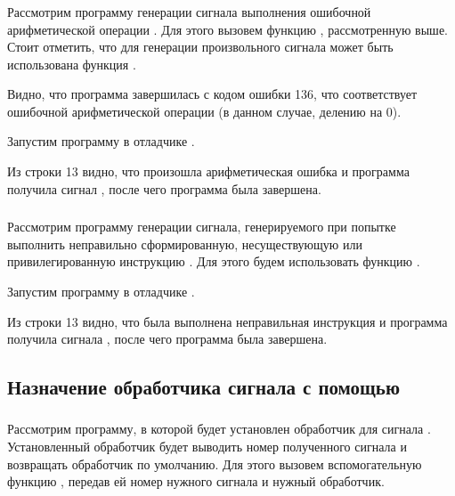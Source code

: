 \subsubsection{}

Рассмотрим программу генерации сигнала выполнения ошибочной арифметической операции . Для этого вызовем функцию , рассмотренную выше. Стоит отметить, что для генерации произвольного сигнала может быть использована функция .


Видно, что программа завершилась с кодом ошибки 136, что соответствует ошибочной арифметической операции (в данном случае, делению на 0).

Запустим программу  в отладчике .


Из строки 13 видно, что произошла арифметическая ошибка и программа получила сигнал , после чего программа была завершена.

\subsubsection{}

Рассмотрим программу генерации сигнала, генерируемого при попытке выполнить неправильно сформированную, несуществующую или привилегированную инструкцию . Для этого будем использовать функцию .


Запустим программу  в отладчике .


Из строки 13 видно, что была выполнена неправильная инструкция и программа получила сигнала , после чего программа была завершена.

\subsection{Назначение обработчика сигнала с помощью }

\subsubsection{}

Рассмотрим программу, в которой будет установлен обработчик для сигнала . Установленный обработчик будет выводить номер полученного сигнала и возвращать обработчик по умолчанию. Для этого вызовем вспомогательную функцию , передав ей номер нужного сигнала и нужный обработчик.

